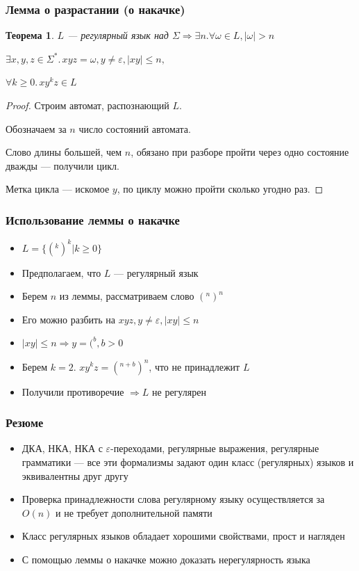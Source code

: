 \documentclass{beamer}
\newtheorem{rutheorem}{Теорема}
\begin{document}
\begin{frame}[fragile]
  \transwipe[direction=90]
  \frametitle{Лемма о разрастании (о накачке)}
  \begin{rutheorem}
  $L$ --- регулярный язык над $\Sigma \Rightarrow \exists n. \forall \omega \in L, | \omega | > n$
  
    $\exists x, y, z \in \Sigma^*. \, xyz = \omega, y \neq \varepsilon, |xy| \leq n,$
    
     $ \forall k \geq 0. \, x y^k z \in L$
  \end{rutheorem}
  
  \begin{proof}
  Строим автомат, распознающий $L$.
  
  Обозначаем за $n$ число состояний автомата.
  
  Слово длины большей, чем $n$, обязано при разборе пройти через одно состояние дважды --- получили цикл. 

  Метка цикла --- искомое $y$, по циклу можно пройти сколько угодно раз.
  
  \end{proof}

\end{frame}


\begin{frame}[fragile]
  \transwipe[direction=90]
  \frametitle{Использование леммы о накачке}
  \begin{itemize}
    \item $L = \{ (^k )^k | k \geq 0\} $
    \item Предполагаем, что $L$ --- регулярный язык
    \item Берем $n$ из леммы, рассматриваем слово $(^n )^n$
    \item Его можно разбить на $xyz, y \neq \varepsilon, |xy| \leq n$
    \item $|xy| \leq n \Rightarrow y = (^b, b > 0$
    \item Берем $k = 2$. $xy^kz = (^{n+b} )^n$, что не принадлежит $L$
    \item Получили противоречие $\Rightarrow L$  не регулярен
  \end{itemize}
  
\end{frame}


\begin{frame}[fragile]
  \transwipe[direction=90]
  \frametitle{Резюме}
  \begin{itemize}
    \item ДКА, НКА, НКА с $\varepsilon$-переходами, регулярные выражения, регулярные грамматики --- все эти формализмы задают один класс (регулярных) языков и эквивалентны друг другу
    \item Проверка принадлежности слова регулярному языку осуществляется за $O(n)$ и не требует дополнительной памяти
    \item Класс регулярных языков обладает хорошими свойствами, прост и нагляден
    \item С помощью леммы о накачке можно доказать нерегулярность языка
  \end{itemize}
  
\end{frame}
\end{document}
